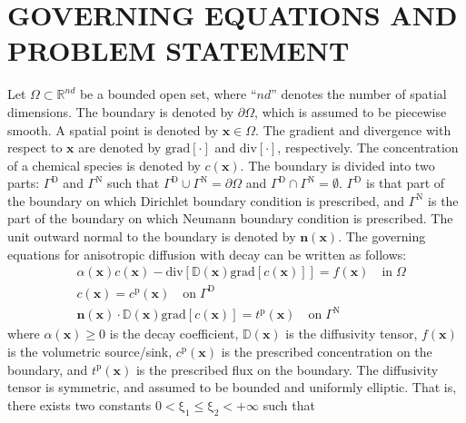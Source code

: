 \documentclass[11pt]{amsart}
\begin{document}
\section{GOVERNING EQUATIONS AND PROBLEM STATEMENT}
\label{Sec:Decay_Governing_equations}
Let $\Omega \subset \mathbb{R}^{nd}$ be a bounded open set, where ``$nd$'' denotes the number 
of spatial dimensions.  The boundary is denoted by $\partial \Omega$, which is assumed to be 
piecewise smooth. A spatial point is denoted by $\mathbf{x} \in \Omega$. The gradient and 
divergence with respect to $\mathbf{x}$ are denoted by $\mathrm{grad}[\cdot]$ and $\mathrm{div}
[\cdot]$, respectively. The concentration of a chemical species is denoted by $c(\mathbf{x})$. 
The boundary is divided into two parts: $\Gamma^{\mathrm{D}}$ and $\Gamma^{\mathrm{N}}$ such that 
$\Gamma^{\mathrm{D}} \cup \Gamma^{\mathrm{N}} = \partial \Omega$ and $\Gamma^{\mathrm{D}} \cap 
\Gamma^{\mathrm{N}} = \emptyset$. $\Gamma^{\mathrm{D}}$ is that part of the boundary on which 
Dirichlet boundary condition is prescribed, and $\Gamma^{\mathrm{N}}$ is the part of the 
boundary on which Neumann boundary condition is prescribed. The unit outward normal to 
the boundary is denoted by $\mathbf{n}(\mathbf{x})$. 
The governing equations for anisotropic diffusion with decay can be written as follows:
\begin{subequations}
  \label{Eqn:Decay_Governing_equations}
  \begin{align}
    \label{Eqn:Decay_diffusion}
    &\alpha(\mathbf{x}) c(\mathbf{x})-\mathrm{div}[\mathbb{D}(\mathbf{x}) \mathrm{grad}
    [c(\mathbf{x})]] = f(\mathbf{x}) \quad \mathrm{in} \; \Omega  \\
& c(\mathbf{x}) = c^{\mathrm{p}}(\mathbf{x}) \quad \mathrm{on} \; 
    \Gamma^{\mathrm{D}} \\
& \mathbf{n}(\mathbf{x}) \cdot \mathbb{D}(\mathbf{x}) \mathrm{grad}[c(\mathbf{x})] 
    = t^{\mathrm{p}}(\mathbf{x}) \quad \mathrm{on} \; \Gamma^{\mathrm{N}} 
  \end{align}
\end{subequations}
where $\alpha(\mathbf{x}) \geq 0$ is the decay coefficient, $\mathbb{D}(\mathbf{x})$ is the diffusivity 
tensor, $f(\mathbf{x})$ is the volumetric source/sink, $c^{\mathrm{p}}(\mathbf{x})$ is the prescribed 
concentration on the boundary, and $t^{\mathrm{p}}(\mathbf{x})$ is the prescribed flux on the boundary. 
The diffusivity tensor is symmetric, and assumed to be bounded and uniformly elliptic. That is, there 
exists two constants $\mathrm{0 < \xi_1 \leq \xi_2 < +\infty}$ such that 
\end{document}
